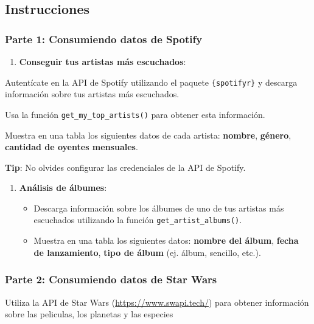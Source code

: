 \documentclass[
  letterpaper,
  DIV=11,
  numbers=noendperiod]{scrreprt}
\providecommand{\tightlist}{%
  \setlength{\itemsep}{0pt}\setlength{\parskip}{0pt}}\usepackage{longtable,booktabs,array}
\begin{document}
\subsection{Instrucciones}\label{instrucciones}

\subsubsection{Parte 1: Consumiendo datos de
Spotify}\label{parte-1-consumiendo-datos-de-spotify}

\begin{enumerate}
\def\labelenumi{\arabic{enumi}.}
\tightlist
\item
  \textbf{Conseguir tus artistas más escuchados}:
\end{enumerate}

Autentícate en la API de Spotify utilizando el paquete
\texttt{\{spotifyr\}} y descarga información sobre tus artistas más
escuchados.

Usa la función \texttt{get\_my\_top\_artists()} para obtener esta
información.

Muestra en una tabla los siguientes datos de cada artista:
\textbf{nombre}, \textbf{género}, \textbf{cantidad de oyentes
mensuales}.

\textbf{Tip}: No olvides configurar las credenciales de la API de
Spotify.

\begin{enumerate}
\def\labelenumi{\arabic{enumi}.}
\setcounter{enumi}{1}
\item
  \textbf{Análisis de álbumes}:

  \begin{itemize}
  \item
    Descarga información sobre los álbumes de uno de tus artistas más
    escuchados utilizando la función \texttt{get\_artist\_albums()}.
  \item
    Muestra en una tabla los siguientes datos: \textbf{nombre del
    álbum}, \textbf{fecha de lanzamiento}, \textbf{tipo de álbum} (ej.
    álbum, sencillo, etc.).
  \end{itemize}
\end{enumerate}

\subsubsection{Parte 2: Consumiendo datos de Star
Wars}\label{parte-2-consumiendo-datos-de-star-wars}

Utiliza la API de Star Wars (\url{https://www.swapi.tech/}) para obtener
información sobre las peliculas, los planetas y las especies
\end{document}
